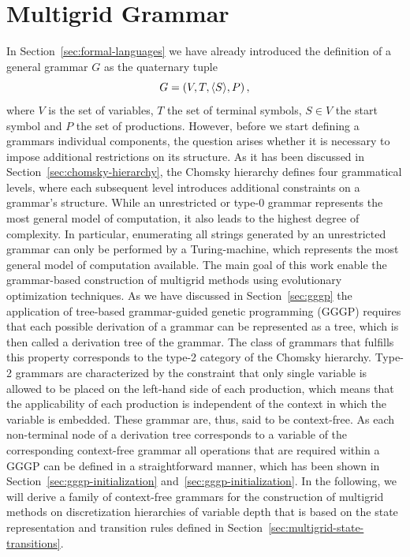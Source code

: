 \section{Multigrid Grammar}
\setcounter{equation}{0}
In Section~\ref{sec:formal-languages} we have already introduced the definition of a general grammar $G$ as the quaternary tuple 
\begin{equation*}
	G = \left(V, T, \langle S \rangle, P \right),
\end{equation*}
where $V$ is the set of variables, $T$ the set of terminal symbols, $S \in V$ the start symbol and $P$ the set of productions.
However, before we start defining a grammars individual components, the question arises whether it is necessary to impose additional restrictions on its structure.
As it has been discussed in Section~\ref{sec:chomsky-hierarchy}, the Chomsky hierarchy defines four grammatical levels, where each subsequent level introduces additional constraints on a grammar's structure.
While an unrestricted or type-0 grammar represents the most general model of computation, it also leads to the highest degree of complexity.
In particular, enumerating all strings generated by an unrestricted grammar can only be performed by a Turing-machine, which represents the most general model of computation available.
The main goal of this work enable the grammar-based construction of multigrid methods using evolutionary optimization techniques.
As we have discussed in Section~\ref{sec:gggp} the application of tree-based grammar-guided genetic programming (GGGP) requires that each possible derivation of a grammar can be represented as a tree, which is then called a derivation tree of the grammar.
The class of grammars that fulfills this property corresponds to the type-2 category of the Chomsky hierarchy.
Type-2 grammars are characterized by the constraint that only single variable is allowed to be placed on the left-hand side of each production, which means that the applicability of each production is independent of the context in which the variable is embedded. 
These grammar are, thus, said to be context-free.
As each non-terminal node of a derivation tree corresponds to a variable of the corresponding context-free grammar all operations that are required within a GGGP can be defined in a straightforward manner, which has been shown in Section~\ref{sec:gggp-initialization} and~\ref{sec:gggp-initialization}.
In the following, we will derive a family of context-free grammars for the construction of multigrid methods on discretization hierarchies of variable depth that is based on the state representation and transition rules defined in Section~\ref{sec:multigrid-state-transitions}.
